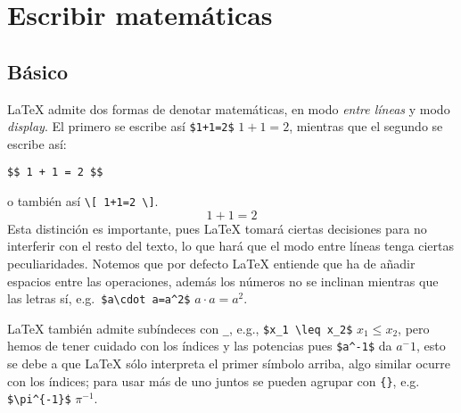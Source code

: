 \documentclass[intro-breve-latex.tex]{subfiles}
\begin{document}
\chapter{Escribir matemáticas}
\label{sec:maths}

\section{Básico}
\nocite{short-math, ams}
\LaTeX{} admite dos formas de denotar matemáticas, en modo \textit{entre líneas} y modo \textit{display}. El primero se
escribe así \lstinline|$1+1=2$| $1+1=2$, mientras que el segundo se escribe así:
\begin{lstlisting}
$$ 1 + 1 = 2 $$
\end{lstlisting}
o también así \lstinline|\[ 1+1=2 \]|.
$$1+1=2$$
Esta distinción es importante, pues \LaTeX{} tomará ciertas decisiones para no interferir con el resto del texto, lo que
hará que el modo entre líneas tenga ciertas peculiaridades. Notemos que por defecto \LaTeX{} entiende que ha de añadir
espacios entre las operaciones, además los números no se inclinan mientras que las letras sí, e.g.\ 
\lstinline|$a\cdot a=a^2$| $a\cdot a=a^2$.

\LaTeX{} también admite subíndeces con \texttt{\_}, e.g., \lstinline|$x_1 \leq x_2$| $x_1 \leq x_2$, pero hemos de tener cuidado con los índices y las potencias pues \lstinline|$a^-1$| da $a^-1$, esto se debe a que \LaTeX{} sólo interpreta el primer símbolo arriba, algo similar ocurre con los índices; para usar más de uno juntos se pueden agrupar con \texttt{\{\}}, e.g. \lstinline|$\pi^{-1}$| $\pi^{-1}$.
\end{document}
